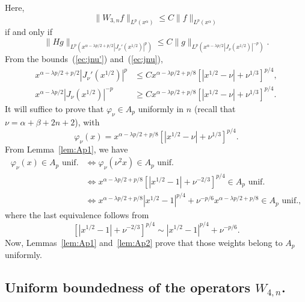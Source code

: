 \documentclass[reqno]{amsart}
\theoremstyle{plain}
\theoremstyle{definition}
\theoremstyle{remark}
\newcommand{\lpnorm}[3]{\|{#1}\|_{L^{#2}({#3})}} %
\begin{document}
Here,
\begin{equation*}
   \lpnorm{W_{3,n}f}p{x^\alpha} \le C \lpnorm{f}p{x^\alpha}
\end{equation*}
if and only if
\begin{equation*}
   \lpnorm{Hg}p{x^{\alpha - \lambda p/2 + {p/2}} |J_\nu'(x^{1/2})|^p}
   \le C \lpnorm{g}p{x^{\alpha - \lambda p/2} |J_\nu(x^{1/2})|^{-p}}.
\end{equation*}
{}From the bounds~(\ref{ec:jnu'}) and~(\ref{ec:jnu}),
\begin{align*}
   x^{\alpha - \lambda p/2 + {p/2}} |J_\nu'(x^{1/2})|^p
   &\le C x^{\alpha - \lambda p/2 + p/8}
   \left[|x^{1/2} - \nu| + \nu^{1/3} \right]^{p/4},
   \\
   x^{\alpha - \lambda p/2} |J_\nu(x^{1/2})|^{-p}
   &\ge C x^{\alpha - \lambda p/2 + p/8}
   \left[|x^{1/2} - \nu| + \nu^{1/3} \right]^{p/4}.
\end{align*}
It will suffice to prove that $\varphi_\nu \in A_p$ uniformly in $n$ (recall
that $\nu = \alpha + \beta + 2n + 2$), with
\begin{equation*}
   \varphi_\nu(x) = x^{\alpha - \lambda p/2 + p/8}
   \left[|x^{1/2} - \nu| + \nu^{1/3} \right]^{p/4}.
\end{equation*}
{}From Lemma~\ref{lem:Ap1}, we have
\begin{align*}
   \varphi_\nu(x) \in A_p {\text{ unif.}}
   &\iff \varphi_\nu(\nu^2 x) \in A_p {\text{ unif.}}
   \\
   &\iff x^{\alpha - \lambda p/2 + p/8}
   \left[ |x^{1/2} - 1| + \nu^{-2/3} \right]^{p/4} \in A_p {\text{ unif.}}
   \\
   &\iff x^{\alpha - \lambda p/2 + p/8} |x^{1/2} - 1|^{p/4}
   + \nu^{-p/6} x^{\alpha - \lambda p/2 + p/8}
   \in A_p {\text{ unif.}},
\end{align*}
where the last equivalence follows from
\begin{equation*}
   \left[ |x^{1/2} - 1| + \nu^{-2/3} \right]^{p/4}
   \sim |x^{1/2} - 1|^{p/4} + \nu^{-p/6}.
\end{equation*}
Now, Lemmas~\ref{lem:Ap1} and~\ref{lem:Ap2} prove that those weights belong to
$A_p$ uniformly.


\subsection{Uniform boundedness of the operators $W_{4,n}$.}
\end{document}
